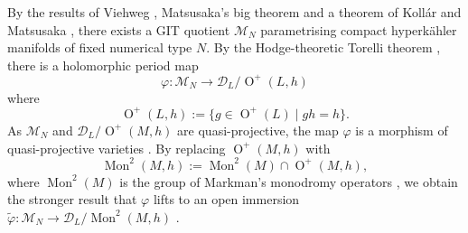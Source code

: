 \documentclass[12pt, a4paper]{article}
\newcommand{\dc}{\mathcal{D}}
\newcommand{\mc}{\mathcal{M}}
\newcommand{\opn}{\operatorname}
\begin{document}
By the results of Viehweg \cite{Viehweg}, Matsusaka's big theorem \cite{Matsusaka} and a theorem of Koll\'ar and Matsusaka \cite{KollarMatsusaka}, there exists a GIT quotient $\mc_N$ parametrising compact hyperk\"ahler manifolds of fixed numerical type $N$.
By the Hodge-theoretic Torelli theorem \cite{HuybrechtsBourbaki, MarkmanTorelli, VerbitskyGlobal}, there is a holomorphic period map 
\[
\varphi: \mc_N \rightarrow \dc_L / \opn{O}^+(L, h)
\]
where 
\[
\opn{O}^+(L, h) := \{ g \in \opn{O}^+(L) \mid gh=h \}.
\]
As $\mc_N$ and $\dc_L / \opn{O}^+(M,h)$ are quasi-projective, the map $\varphi$ is a morphism of quasi-projective varieties \cite{borelmetric}.
By replacing $\opn{O}^+(M,h)$ with 
\[
\opn{Mon}^2(M, h):= \opn{Mon}^2(M) \cap \opn{O}^+(M, h),
\]
where $\opn{Mon}^2(M)$ is the group of Markman's monodromy operators  \cite{monok3ii, monok3, intk3}, we obtain the stronger result that $\varphi$ lifts to an open immersion $\widetilde{\varphi}: \mc_N \rightarrow \dc_L/\opn{Mon}^2(M, h)$  \cite[Theorem 3.10]{Handbook}.
\end{document}
